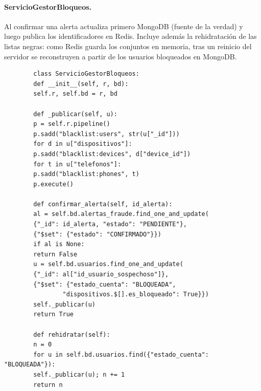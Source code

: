 \documentclass[11pt,a4paper]{article}
\begin{document}
	\paragraph{ServicioGestorBloqueos.} Al confirmar una alerta actualiza primero MongoDB (fuente de la verdad) y luego publica los identificadores en Redis. Incluye además la rehidratación de las listas negras: como Redis guarda los conjuntos en memoria, tras un reinicio del servidor se reconstruyen a partir de los usuarios bloqueados en MongoDB.
	\begin{lstlisting}
		class ServicioGestorBloqueos:
		def __init__(self, r, bd):
		self.r, self.bd = r, bd
		
		def _publicar(self, u):
		p = self.r.pipeline()
		p.sadd("blacklist:users", str(u["_id"]))
		for d in u["dispositivos"]:
		p.sadd("blacklist:devices", d["device_id"])
		for t in u["telefonos"]:
		p.sadd("blacklist:phones", t)
		p.execute()
		
		def confirmar_alerta(self, id_alerta):
		al = self.bd.alertas_fraude.find_one_and_update(
		{"_id": id_alerta, "estado": "PENDIENTE"},
		{"$set": {"estado": "CONFIRMADO"}})
		if al is None:
		return False
		u = self.bd.usuarios.find_one_and_update(
		{"_id": al["id_usuario_sospechoso"]},
		{"$set": {"estado_cuenta": "BLOQUEADA",
				"dispositivos.$[].es_bloqueado": True}})
		self._publicar(u)
		return True
		
		def rehidratar(self):
		n = 0
		for u in self.bd.usuarios.find({"estado_cuenta": "BLOQUEADA"}):
		self._publicar(u); n += 1
		return n
	\end{lstlisting}
	
\end{document}
